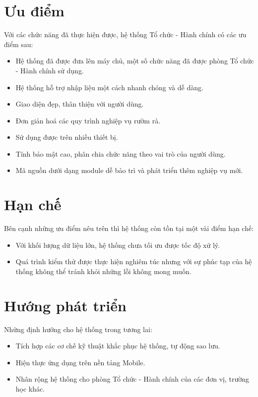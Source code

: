 \section{Ưu điểm}
Với các chức năng đã thực hiện được, hệ thống Tổ chức - Hành chính có các ưu điểm sau:
\begin{itemize}
    \item Hệ thống đã được đưa lên máy chủ, một số chức năng đã được phòng Tổ chức - Hành chính sử dụng.
    \item Hệ thống hỗ trợ nhập liệu một cách nhanh chóng và dễ dàng.
    \item Giao diện đẹp, thân thiện với người dùng.
    \item Đơn giản hoá các quy trình nghiệp vụ rườm rà.
    \item Sử dụng được trên nhiều thiết bị.
    \item Tính bảo mật cao, phân chia chức năng theo vai trò của người dùng.
    \item Mã nguồn dưới dạng module dễ bảo trì và  phát triển thêm nghiệp vụ mới.
\end{itemize}
\section{Hạn chế}
Bên cạnh những ưu điểm nêu trên thì hệ thống còn tồn tại một vài điểm hạn chế:
\begin{itemize}
    \item Với khối lượng dữ liệu lớn, hệ thống chưa tối ưu được tốc độ xử lý.
    \item Quá trình kiểm thử được thực hiện nghiêm túc nhưng với sự phúc tạp của hệ thống không thể tránh khỏi những lỗi không mong muốn.
\end{itemize}
\section{Hướng phát triển}
Những định hướng cho hệ thống trong tương lai:
\begin{itemize}
    \item Tích hợp các cơ chế kỹ thuật khắc phục hệ thống, tự động sao lưu.
    \item Hiện thực ứng dụng trên nền tảng Mobile.
    \item Nhân rộng hệ thống cho phòng Tổ chức - Hành chính của các đơn vị, trường học khác.
\end{itemize}